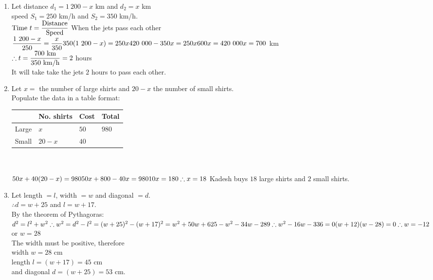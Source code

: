  \begin{solutions}{}{
\begin{enumerate}[itemsep=10pt, label=\textbf{\arabic*}. ] 


\item Let distance $d_1=1~200-x$ km and $d_2=x$ km \\
speed $S_1=250$ km/h and $S_2=350$ km/h. \\
$\mbox{Time } t = \dfrac{\mbox{Distance}}{\mbox{Speed}} \\[5pt]$
When the jets pass each other $\dfrac{1~200-x}{250} = \dfrac{x}{350}\\[5pt]
350(1~200-x)=250x\\
420~000 - 350x = 250x\\
600x = 420~000\\
x= 700$ km\\[5pt]

$\therefore t=\dfrac{700\mbox{ km}}{350{\mbox{ km/h}}}\\[5pt]
=2$ hours\\
It will take take the jets $2$ hours to pass each other.

\item  Let $x=$ the number of large shirts and $20-x$ the number of small shirts.\\
Populate the data in a table format:\\
  \begin{tabularx}{8cm}{ |X|X|X|X| }\hline
& No. shirts & Cost & Total \\ \hline
Large & $x$ & $50$ & $980$\\ \hline
Small & $20-x$ & $40$&\\ \hline
\end{tabularx}\\
\\
$50x+40(20-x)=980\\
50x+800-40x=980\\
10x=180\\
\therefore x=18\\$
Kadesh buys $18$ large shirts and $2$ small shirts.

\item Let length $=l$, width $=w$ and diagonal $=d$.\\
$\therefore d=w+25$ and $l=w+17$.\\
By the theorem of Pythagoras:\\
$d^2 = l^2+w^2\\
\therefore w^2 = d^2-l^2\\
=(w+25)^2 - (w+17)^2\\
=w^2+50w+625-w^2-34w-289\\
\therefore w^2 - 16w - 336 = 0\\
(w+12)(w-28)=0\\
\therefore w= -12$ or $w=28$\\
The width must be positive, therefore \\
width $w=28$ cm\\ 
length $l=(w+17)=45$ cm \\
and diagonal $d=(w+25)=53$ cm.



\end{enumerate}}
\end{solutions}
